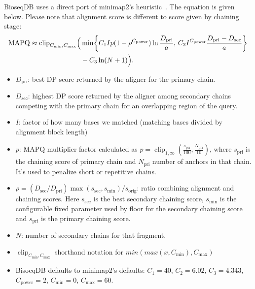 BioseqDB uses a direct port of minimap2's heuristic~\autocite{minimap2_mapq_implementation}.
The equation is given below. Please note that alignment score is different to score given by chaining stage:
\begin{equation}
  \begin{aligned}
    \mathrm{MAPQ}\approx\operatorname{clip}_{C_{\min},C_{\max}}\Bigl(
      &\min\!\left\{
        C_1Ip(1-\rho^{C_{\mathrm{power}}})\ln\frac{D_{\mathrm{pri}}}{a},\,
        C_2I^{C_{\mathrm{power}}}\frac{D_{\mathrm{pri}}-D_{\mathrm{sec}}}{a}
      \right\}\\
      &{}-C_3\ln(N+1)
    \Bigr).
  \end{aligned}
  \label{eq:mapq-final}
\end{equation}
\begin{itemize}
  \item \(D_{\mathrm{pri}}\): best DP score returned by the aligner for the
    primary chain.
  \item \(D_{\mathrm{sec}}\): highest DP score returned by the aligner among
    secondary chains competing with the primary chain for an overlapping
    region of the query.
  \item \(I\): factor of how many bases we matched (matching bases divided by alignment block length)
  \item \(p\): MAPQ multiplier factor calculated as $p=\operatorname{clip}_{1,\infty}(\frac{s_{\mathrm{pri}}}{100}, \frac{N_{\mathrm{pri}}}{10})$,
  where ${s}_{\mathrm{pri}}$ is the chaining score of primary chain and ${N}_{\mathrm{pri}}$ number of anchors in that chain.
  It's used to penalize short or repetitive chains.
  \item \(\rho=(D_{\mathrm{sec}}/D_{\mathrm{pri}})
    \max(s_{\mathrm{sec}},s_{\min})/s_{\mathrm{orig}}\): ratio combining alignment and chaining scores. 
    Here \(s_{\mathrm{sec}}\) is the best secondary chaining score, \(s_{\min}\) is the configurable fixed parameter used by floor for the secondary chaining score and \(s_{\mathrm{pri}}\) is
    the primary chaining score.
  \item \(N\): number of secondary chains for that fragment.
  \item \(\operatorname{clip}_{C_{\min},C_{\max}}\) shorthand notation for $min(max(x, C_{\min}), C_{\max})$
  \item BisoeqDB defaults to minimap2's defaults: \(C_1=40\), \(C_2=6.02\), \(C_3=4.343\),
    \(C_{\mathrm{power}}=2\), \(C_{\min}=0\), \(C_{\max}=60\).
\end{itemize}

